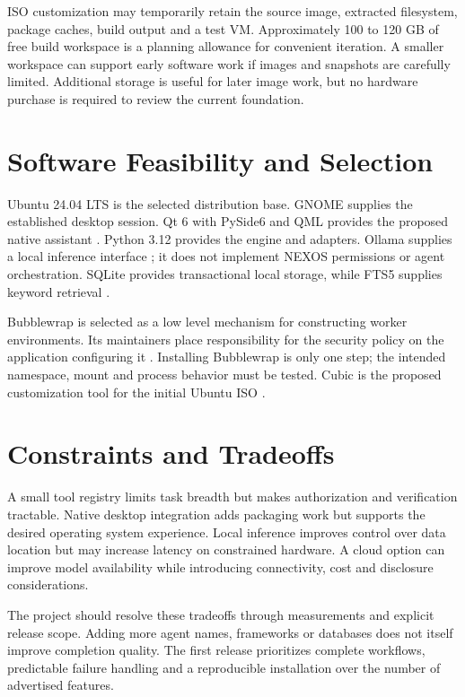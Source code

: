 ISO customization may temporarily retain the source image, extracted filesystem, package caches, build output and a test VM. Approximately 100 to 120 GB of free build workspace is a planning allowance for convenient iteration. A smaller workspace can support early software work if images and snapshots are carefully limited. Additional storage is useful for later image work, but no hardware purchase is required to review the current foundation.

\section{Software Feasibility and Selection}
Ubuntu 24.04 LTS is the selected distribution base. GNOME supplies the established desktop session. Qt 6 with PySide6 and QML provides the proposed native assistant \cite{qt}. Python 3.12 provides the engine and adapters. Ollama supplies a local inference interface \cite{ollama}; it does not implement NEXOS permissions or agent orchestration. SQLite provides transactional local storage, while FTS5 supplies keyword retrieval \cite{fts5}.

Bubblewrap is selected as a low level mechanism for constructing worker environments. Its maintainers place responsibility for the security policy on the application configuring it \cite{bubblewrap}. Installing Bubblewrap is only one step; the intended namespace, mount and process behavior must be tested. Cubic is the proposed customization tool for the initial Ubuntu ISO \cite{cubic}.

\section{Constraints and Tradeoffs}
A small tool registry limits task breadth but makes authorization and verification tractable. Native desktop integration adds packaging work but supports the desired operating system experience. Local inference improves control over data location but may increase latency on constrained hardware. A cloud option can improve model availability while introducing connectivity, cost and disclosure considerations.

The project should resolve these tradeoffs through measurements and explicit release scope. Adding more agent names, frameworks or databases does not itself improve completion quality. The first release prioritizes complete workflows, predictable failure handling and a reproducible installation over the number of advertised features.

